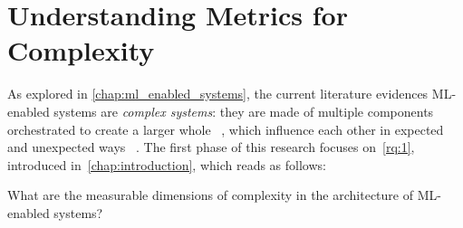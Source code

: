   \clearpage


  \section{Understanding Metrics for Complexity}
  \label{sec:methodology_phase_1}
  \MethodologyPhase

  As explored in \cref{chap:ml_enabled_systems}, the current literature
  evidences ML-enabled systems are \emph{complex systems}:
  they are made of multiple components orchestrated to create a larger whole%
  ~\parencite{Benton2020MachineApplications,Chadli2024TheStudy,
  Kreuzberger2023MachineArchitecture,Lwakatare2020Large-ScaleSolutions,
  Steidl2023ThePractice,Tamburri2020SustainableChallenges,Tang2021AnSystems},
  which influence each other in expected%
  ~\parencite{John2021TowardsModel,Serban2021PracticesApplications,
  Wan2021HowPractices}
  and unexpected ways%
  ~\parencite{Sculley2015HiddenSystems,Tang2021AnSystems}.
  The first phase of this research focuses on~\cref{rq:1},
  introduced in~\cref{chap:introduction}, which reads as follows:
  

  \begin{revisitresearchquestion}{1}
      What are the measurable dimensions of complexity in
      the architecture of ML-enabled systems?
  \end{revisitresearchquestion}


